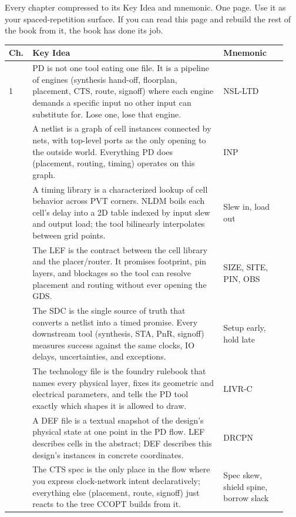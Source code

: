 Every chapter compressed to its Key Idea and mnemonic. One page. Use it as your spaced-repetition surface. If you can read this page and rebuild the rest of the book from it, the book has done its job.

\bigskip

\begin{tabular}{@{}p{0.06\linewidth} p{0.66\linewidth} p{0.22\linewidth}@{}}
\toprule
\textbf{Ch.} & \textbf{Key Idea} & \textbf{Mnemonic} \\
\midrule
1 & PD is not one tool eating one file. It is a pipeline of engines (synthesis hand-off, floorplan, placement, CTS, route, signoff) where each engine demands a specific input no other input can substitute for. Lose one, lose that engine. & NSL-LTD \\
\addlinespace
2 & A netlist is a graph of cell instances connected by nets, with top-level ports as the only opening to the outside world. Everything PD does (placement, routing, timing) operates on this graph. & INP \\
\addlinespace
3 & A timing library is a characterized lookup of cell behavior across PVT corners. NLDM boils each cell's delay into a 2D table indexed by input slew and output load; the tool bilinearly interpolates between grid points. & Slew in, load out \\
\addlinespace
4 & The LEF is the contract between the cell library and the placer/router. It promises footprint, pin layers, and blockages so the tool can resolve placement and routing without ever opening the GDS. & SIZE, SITE, PIN, OBS \\
\addlinespace
5 & The SDC is the single source of truth that converts a netlist into a timed promise. Every downstream tool (synthesis, STA, PnR, signoff) measures success against the same clocks, IO delays, uncertainties, and exceptions. & Setup early, hold late \\
\addlinespace
6 & The technology file is the foundry rulebook that names every physical layer, fixes its geometric and electrical parameters, and tells the PD tool exactly which shapes it is allowed to draw. & LIVR-C \\
\addlinespace
7 & A DEF file is a textual snapshot of the design's physical state at one point in the PD flow. LEF describes cells in the abstract; DEF describes this design's instances in concrete coordinates. & DRCPN \\
\addlinespace
8 & The CTS spec is the only place in the flow where you express clock-network intent declaratively; everything else (placement, route, signoff) just reacts to the tree CCOPT builds from it. & Spec skew, shield spine, borrow slack \\

\end{tabular}

